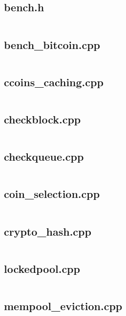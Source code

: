 \documentclass{article}
\begin{document}
\subsection{bench.h}
\inputminted{cpp}{/home/dufferzafar/dev/@clones/bitcoin/src/bench/bench.h}
\newpage

\subsection{bench\_bitcoin.cpp}
\inputminted{cpp}{/home/dufferzafar/dev/@clones/bitcoin/src/bench/bench_bitcoin.cpp}
\newpage

\subsection{ccoins\_caching.cpp}
\inputminted{cpp}{/home/dufferzafar/dev/@clones/bitcoin/src/bench/ccoins_caching.cpp}
\newpage

\subsection{checkblock.cpp}
\inputminted{cpp}{/home/dufferzafar/dev/@clones/bitcoin/src/bench/checkblock.cpp}
\newpage

\subsection{checkqueue.cpp}
\inputminted{cpp}{/home/dufferzafar/dev/@clones/bitcoin/src/bench/checkqueue.cpp}
\newpage

\subsection{coin\_selection.cpp}
\inputminted{cpp}{/home/dufferzafar/dev/@clones/bitcoin/src/bench/coin_selection.cpp}
\newpage

\subsection{crypto\_hash.cpp}
\inputminted{cpp}{/home/dufferzafar/dev/@clones/bitcoin/src/bench/crypto_hash.cpp}
\newpage

\subsection{lockedpool.cpp}
\inputminted{cpp}{/home/dufferzafar/dev/@clones/bitcoin/src/bench/lockedpool.cpp}
\newpage

\subsection{mempool\_eviction.cpp}
\inputminted{cpp}{/home/dufferzafar/dev/@clones/bitcoin/src/bench/mempool_eviction.cpp}
\newpage
\end{document}
